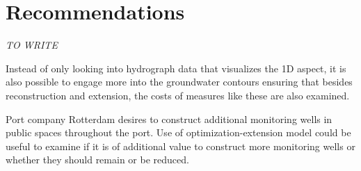 \chapter{Recommendations}
\label{chapter:recommendations}

\emph{TO WRITE}

Instead of only looking into hydrograph data that visualizes the 1D aspect, it is also possible to engage more into the groundwater contours ensuring that besides reconstruction and extension, the costs of measures like these are also examined. 

Port company Rotterdam desires to construct additional monitoring wells in public spaces throughout the port. Use of optimization-extension model could be useful to examine if it is of additional value to construct more monitoring wells or whether they should remain or be reduced.


